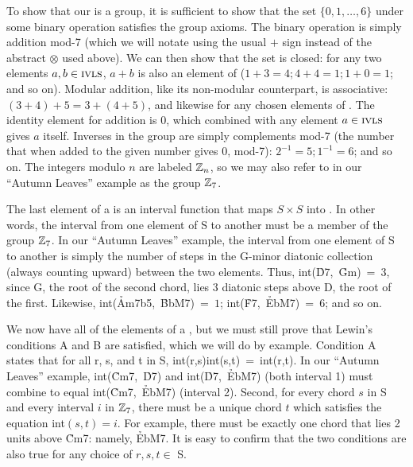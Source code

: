\documentclass[diss]{subfiles}
\begin{document}
To show that our \ivls{} is a group, it is sufficient to show that the set
$\{0,1,\ldots,6\}$ under some binary operation satisfies the group axioms. The
binary operation is simply addition mod-7 (which we will notate using the usual $+$
sign instead of the abstract $\otimes$ used above).  We can then show that the
set \ivls{} is closed: for any two elements $a, b \in \mathrm{\textsc{ivls}{}}$, $a + b$ is
also an element of \ivls{} ($1 + 3 = 4; 4 + 4 = 1; 1 + 0 = 1$; and so on).
Modular addition, like its non-modular counterpart, is associative:
$(3 + 4) + 5 = 3 + (4 + 5)$, and likewise for any chosen elements of \ivls{}.
The identity element for addition is $0$, which combined with any element $a \in
\mathrm{\textsc{ivls}{}}$ gives $a$ itself. Inverses in the group are simply complements
mod-7 (the number that when added to the given number gives $0$, mod-7):
$2^{-1} = 5; 1^{-1} = 6$; and so on. The integers modulo $n$ are labeled
$\mathbb{Z}_n$, so we may also refer to \ivls{} in our “Autumn Leaves” example as
the group $\mathbb{Z}_7$.

The last element of a \gis{} is an interval function that maps $S \times S$ into
\ivls{}. In other words, the interval from one element of S to another must be a
member of the group $\mathbb{Z}_7$. In our “Autumn Leaves” example, the interval
from one element of S to another is simply the number of steps in the G-minor
diatonic collection (always counting upward) between the two elements. Thus,
\mbox{int(\h{D7}, \h{Gm}) = $3$}, since G, the root of the second chord, lies
3 diatonic steps above D, the root of the first. Likewise,
\mbox{int(\h{Am7b5}, \h{BbM7}) = $1$}; \mbox{int(\h{F7}, \h{EbM7}) = $6$}; and so
on.

We now have all of the elements of a \gis{}, but we must still prove that Lewin’s
conditions A and B are satisfied, which we will do by example. Condition A
states that for all r, s, and t in S, \mbox{int(r,s)int(s,t) = int(r,t)}. In
our “Autumn Leaves” example, \mbox{int(\h{Cm7}, \h{D7})} and \mbox{int(\h{D7}, \h{EbM7})}
(both interval 1) must combine to equal \mbox{int(\h{Cm7}, \h{EbM7})} (interval
2). Second, for every chord $s$ in S and every interval $i$ in $\mathbb{Z}_7$,
there must be a unique chord $t$ which satisfies the equation \mbox{int$(s,t)
= i$}. For example, there must be exactly one chord that lies 2 units above
\h{Cm7}: namely, \h{EbM7}. It is easy to confirm that the two conditions
are also true for any choice of $r, s, t \in$ S.
\end{document}
